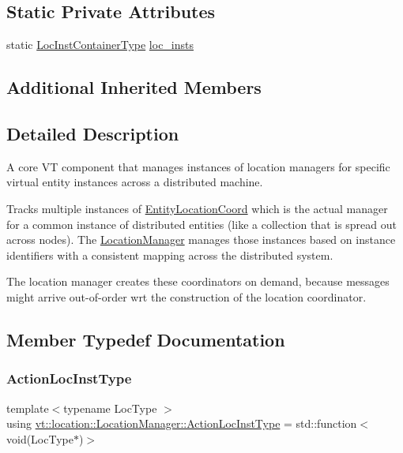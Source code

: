 \subsection*{Static Private Attributes}
\begin{DoxyCompactItemize}
\item 
static \hyperlink{structvt_1_1location_1_1_location_manager_adf4df6480ad89271a802d6d59bcf424e}{Loc\+Inst\+Container\+Type} \hyperlink{structvt_1_1location_1_1_location_manager_ae1f3b1c4bf75a14fce51a284bd692fe3}{loc\+\_\+insts}
\end{DoxyCompactItemize}
\subsection*{Additional Inherited Members}


\subsection{Detailed Description}
A core VT component that manages instances of location managers for specific virtual entity instances across a distributed machine. 

Tracks multiple instances of {\ttfamily \hyperlink{structvt_1_1location_1_1_entity_location_coord}{Entity\+Location\+Coord}} which is the actual manager for a common instance of distributed entities (like a collection that is spread out across nodes). The {\ttfamily \hyperlink{structvt_1_1location_1_1_location_manager}{Location\+Manager}} manages those instances based on instance identifiers with a consistent mapping across the distributed system.

The location manager creates these coordinators on demand, because messages might arrive out-\/of-\/order wrt the construction of the location coordinator. 

\subsection{Member Typedef Documentation}
\mbox{\label{structvt_1_1location_1_1_location_manager_a6de3841092c537efc5fb8376128bfe18}} 
\subsubsection{\texorpdfstring{Action\+Loc\+Inst\+Type}{ActionLocInstType}}
{\footnotesize\ttfamily template$<$typename Loc\+Type $>$ \\
using \hyperlink{structvt_1_1location_1_1_location_manager_a6de3841092c537efc5fb8376128bfe18}{vt\+::location\+::\+Location\+Manager\+::\+Action\+Loc\+Inst\+Type} =  std\+::function$<$void(Loc\+Type$\ast$)$>$}

